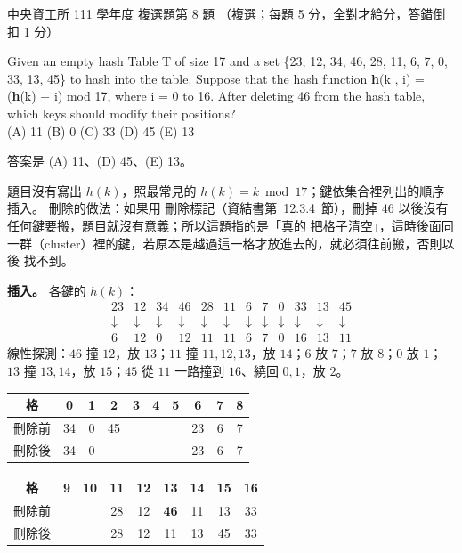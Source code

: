 \begin{pastexam}[label={px:ncu-111-dsa-08}]{中央資工所 111 學年度 複選題第 8 題}
（複選；每題 5 分，全對才給分，答錯倒扣 1 分）

Given an empty hash Table T of size 17 and a set \{23, 12, 34, 46, 28, 11, 6, 7, 0, 33, 13, 45\}
to hash into the table. Suppose that the hash function \textbf{h}(k , i) = (\textbf{h}(k) + i) mod
17, where i = 0 to 16. After deleting 46 from the hash table, which keys should modify their
positions?\\
(A) 11 \quad (B) 0 \quad (C) 33 \quad (D) 45 \quad (E) 13
\end{pastexam}

\begin{pastsoln}
答案是 (A) 11、(D) 45、(E) 13。

題目沒有寫出 $h(k)$，照最常見的 $h(k) = k \bmod 17$；鍵依集合裡列出的順序插入。 刪除的做法：如果用
刪除標記（資結書第~12.3.4~節），刪掉 $46$ 以後沒有任何鍵要搬，題目就沒有意義；所以這題指的是「真的
把格子清空」，這時後面同一群（cluster）裡的鍵，若原本是越過這一格才放進去的，就必須往前搬，否則以後
找不到。

\textbf{插入。} 各鍵的 $h(k)$：
\[
\begin{array}{cccccccccccc}
23 & 12 & 34 & 46 & 28 & 11 & 6 & 7 & 0 & 33 & 13 & 45 \\
\downarrow & \downarrow & \downarrow & \downarrow & \downarrow & \downarrow & \downarrow & \downarrow & \downarrow & \downarrow & \downarrow & \downarrow \\
6 & 12 & 0 & 12 & 11 & 11 & 6 & 7 & 0 & 16 & 13 & 11
\end{array}
\]
線性探測：$46$ 撞 $12$，放 $13$；$11$ 撞 $11, 12, 13$，放 $14$；$6$ 放 $7$；$7$ 放 $8$；$0$ 放 $1$；
$13$ 撞 $13, 14$，放 $15$；$45$ 從 $11$ 一路撞到 $16$、繞回 $0, 1$，放 $2$。
\begin{center}
\small
\begin{tabular}{c|ccccccccc}
格 & 0 & 1 & 2 & 3 & 4 & 5 & 6 & 7 & 8 \\ \hline
刪除前 & 34 & 0 & 45 & & & & 23 & 6 & 7 \\
刪除後 & 34 & 0 & & & & & 23 & 6 & 7 \\
\end{tabular}
\qquad
\begin{tabular}{c|cccccccc}
格 & 9 & 10 & 11 & 12 & 13 & 14 & 15 & 16 \\ \hline
刪除前 & & & 28 & 12 & \textbf{46} & 11 & 13 & 33 \\
刪除後 & & & 28 & 12 & 11 & 13 & 45 & 33 \\
\end{tabular}
\end{center}


\end{pastsoln}
